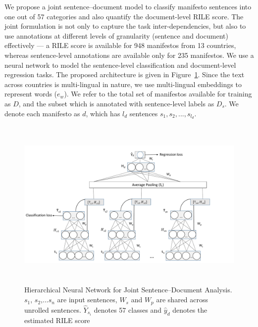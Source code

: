\documentclass[11pt,a4paper]{article}
\newcommand{\figref}[2][]{Figure#1~\ref{#2}\xspace}
\begin{document}
We propose a joint sentence--document model to classify manifesto sentences into one out of 57 categories and also quantify the document-level RILE score. The joint formulation is not only to capture the task inter-dependencies, but also to use annotations at different levels of granularity (sentence and document) effectively --- a RILE score is available for 948 manifestos from 13 countries, whereas sentence-level annotations are available only for 235 manifestos. We use a neural network to model the sentence-level classification and document-level regression tasks. The proposed architecture is given in \figref{fig:HNN}. Since the text across countries is multi-lingual in nature, we use multi-lingual embeddings to represent words ($e_{w}$). We refer to the total set of manifestos available for training as $D$, and the subset which is annotated with sentence-level labels as $D_{s}$. We denote each manifesto as $d$, which has $l_{d}$ sentences $s_{1}, s_{2}, ..., s_{l_{d}}$. 


\begin{figure}[!t]
\centering
\includegraphics[height=8.4cm, scale=1.4]{ALTA_Model.pdf}
\caption{Hierarchical Neural Network for Joint Sentence--Document Analysis. $s_{1}$, $s_{2}$,...$s_{n}$ are input sentences, $W_{s}$ and $W_{p}$ are shared across unrolled sentences. $\hat{Y}_{s_{i}}$ denotes  57 classes and $\hat{y}_{d}$ denotes the estimated RILE score}
 \label{fig:HNN}
 \end{figure}
\end{document}
